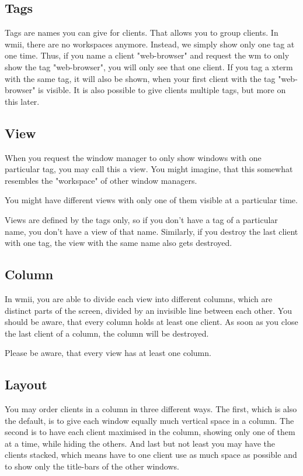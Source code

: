 \documentclass[12pt,a4paper]{article}
\begin{document}
  \subsection{Tags}

    Tags are names you can give for clients. That allows you to group
    clients.  In wmii, there are no workspaces anymore. Instead, we
    simply show only one tag at one time. Thus, if you name a client
    "web-browser" and request the wm to only show the tag
    "web-browser", you will only see that one client. If you tag a
    xterm with the same tag, it will also be shown, when your first
    client with the tag "web-browser" is visible. It is also possible
    to give clients multiple tags, but more on this later.

  \subsection{View}

    When you request the window manager to only show windows with one
    particular tag, you may call this a view. You might imagine, that
    this somewhat resembles the "workspace" of other window managers.

    You might have different views with only one of them visible at a
    particular time.

    Views are defined by the tags only, so if you don't have a tag of
    a particular name, you don't have a view of that name.  Similarly,
    if you destroy the last client with one tag, the view with the
    same name also gets destroyed.

  \subsection{Column}

    In wmii, you are able to divide each view into different columns,
    which are distinct parts of the screen, divided by an invisible
    line between each other. You should be aware, that every column
    holds at least one client. As soon as you close the last client of
    a column, the column will be destroyed.

    Please be aware, that every view has at least one column.

  \subsection{Layout}

    You may order clients in a column in three different ways. The
    first, which is also the default, is to give each window equally
    much vertical space in a column. The second is to have each client
    maximised in the column, showing only one of them at a time, while
    hiding the others. And last but not least you may have the clients
    stacked, which means have to one client use as much space as
    possible and to show only the title-bars of the other windows.
\end{document}
